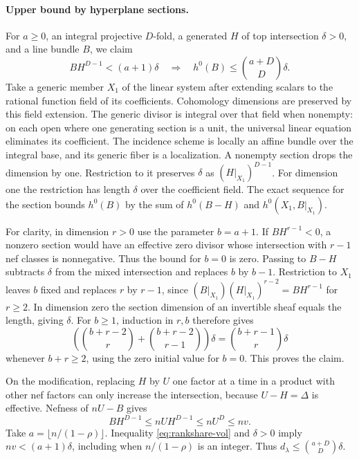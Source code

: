 \paragraph{Upper bound by hyperplane sections.}
For \(a\ge0\), an integral projective \(D\)-fold, a generated \(H\) of
top intersection \(\delta>0\), and a line bundle \(B\), we claim
\[
 B H^{D-1} < (a+1)\delta
 \quad\Longrightarrow\quad h^0(B)\le\binom{a+D}{D}\delta .
\]
Take a generic member \(X_1\) of the linear system after extending scalars
to the rational function field of its coefficients. Cohomology dimensions
are preserved by this field extension. The generic divisor is integral
over that field when nonempty: on each open where one generating section
is a unit, the universal linear equation eliminates its coefficient.
The incidence scheme is locally an affine bundle over the integral base,
and its generic fiber is a localization. A nonempty section drops the
dimension by one. Restriction to it preserves \(\delta\) as
\((H|_{X_1})^{D-1}\). For dimension one the restriction has length
\(\delta\) over the coefficient field. The exact sequence for the section
bounds \(h^0(B)\) by the sum of \(h^0(B-H)\) and
\(h^0(X_1,B|_{X_1})\).

For clarity, in dimension \(r>0\) use the parameter \(b=a+1\). If
\(BH^{r-1}<0\), a nonzero section would have an effective zero divisor
whose intersection with \(r-1\) nef classes is nonnegative. Thus the
bound for \(b=0\) is zero. Passing to \(B-H\) subtracts \(\delta\)
from the mixed intersection and replaces \(b\) by \(b-1\). Restriction
to \(X_1\) leaves \(b\) fixed and replaces \(r\) by \(r-1\), since
\((B|_{X_1})(H|_{X_1})^{r-2}=BH^{r-1}\) for \(r\ge2\).
In dimension zero the section dimension of an invertible sheaf equals
the length, giving \(\delta\). For \(b\ge1\), induction in \(r,b\)
therefore gives
\[
 \left(\binom{b+r-2}{r}+\binom{b+r-2}{r-1}\right)\delta
   =\binom{b+r-1}{r}\delta
\]
whenever \(b+r\ge2\), using the zero initial value for \(b=0\).
This proves the claim.

On the modification, replacing \(H\) by \(U\) one factor at a time
in a product with other nef factors can only increase the intersection,
because \(U-H=\Delta\) is effective. Nefness of \(nU-B\) gives
\[
 BH^{D-1}\le nUH^{D-1}\le nU^D\le nv .
\]
Take \(a=\lfloor n/(1-\rho)\rfloor\). Inequality
\eqref{eq:rankshare-vol} and \(\delta>0\) imply
\(nv<(a+1)\delta\), including when \(n/(1-\rho)\) is an integer.
Thus \(d_\lambda\le\binom{a+D}{D}\delta\).


